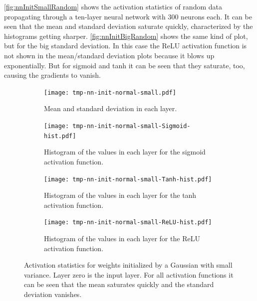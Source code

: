 			\autoref{fig:nnInitSmallRandom} shows the activation statistics of random data propagating through a ten-layer neural network with \num{300} neurons each. It can be seen that the mean and standard deviation saturate quickly, characterized by the histograms getting sharper. \autoref{fig:nnInitBigRandom} shows the same kind of plot, but for the big standard deviation. In this case the ReLU activation function is not shown in the mean/standard deviation plots because it blows up exponentially. But for sigmoid and tanh it can be seen that they saturate, too, causing the gradients to vanish.

			\begin{figure}
				\centering
				\begin{subfigure}{\linewidth}
					\texttt{[image: tmp-nn-init-normal-small.pdf]}
					\caption{Mean and standard deviation in each layer.}
				\end{subfigure}
				\begin{subfigure}{\linewidth}
					\texttt{[image: tmp-nn-init-normal-small-Sigmoid-hist.pdf]}
					\caption{Histogram of the values in each layer for the sigmoid activation function.}
				\end{subfigure}
				\begin{subfigure}{\linewidth}
					\texttt{[image: tmp-nn-init-normal-small-Tanh-hist.pdf]}
					\caption{Histogram of the values in each layer for the tanh activation function.}
				\end{subfigure}
				\begin{subfigure}{\linewidth}
					\texttt{[image: tmp-nn-init-normal-small-ReLU-hist.pdf]}
					\caption{Histogram of the values in each layer for the ReLU activation function.}
				\end{subfigure}
				\caption{Activation statistics for weights initialized by a Gaussian with small variance. Layer zero is the input layer. For all activation functions it can be seen that the mean saturates quickly and the standard deviation vanishes.}
				\label{fig:nnInitSmallRandom}
			\end{figure}

